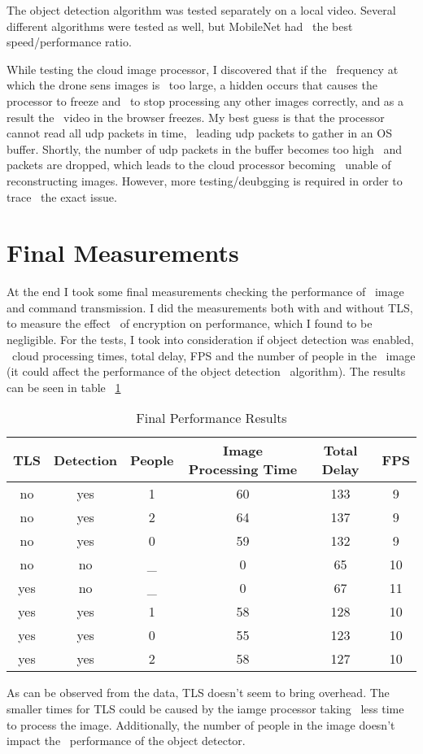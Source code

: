 The object detection algorithm was tested separately on a local video.
Several different algorithms were tested as well, but MobileNet had \
the best speed/performance ratio.

While testing the cloud image processor, I discovered that if the \
frequency at which the drone sens images is \
too large, a hidden occurs that causes the processor to freeze and \
to stop processing any other images correctly, and as a result the \
video in the browser freezes.
My best guess is that the processor cannot read all udp packets in time, \
leading udp packets to gather in an OS buffer.
Shortly, the number of udp packets in the buffer becomes too high \
and packets are dropped, which leads to the cloud processor becoming \
unable of reconstructing images.
However, more testing/deubgging is required in order to trace \
the exact issue.

\section{Final Measurements}
\label{sec:final-measurements}

At the end I took some final measurements checking the performance of \
image and command transmission.
I did the measurements both with and without TLS, to measure the effect \
of encryption on performance, which I found to be negligible.
For the tests, I took into consideration if object detection was enabled, \
cloud processing times, total delay, FPS and the number of people in the \
image (it could affect the performance of the object detection \
algorithm).
The results can be seen in table ~\ref{tab:final-results}

\begin{table}[ht]
    \caption{Final Performance Results}
    \centering
    \begin{tabular}{|c|c|c|c|c|c|}
        \hline\hline
        TLS & Detection & People & Image Processing Time & Total Delay & FPS \\
        \hline
        no  & yes & 1   & 60 & 133  & 9 \\
        no  & yes & 2   & 64 & 137  & 9 \\
        no  & yes & 0   & 59 & 132  & 9 \\
        no  & no  & \_  & 0  & 65   & 10 \\
        yes & no  & \_  & 0  & 67   & 11 \\
        yes & yes & 1   & 58 & 128  & 10 \\
        yes & yes & 0   & 55 & 123  & 10 \\
        yes & yes & 2   & 58 & 127  & 10 \\
        \hline
    \end{tabular}
    \label{tab:final-results}
\end{table}

As can be observed from the data, TLS doesn't seem to bring overhead.
The smaller times for TLS could be caused by the iamge processor taking \
less time to process the image.
Additionally, the number of people in the image doesn't impact the \
performance of the object detector.
